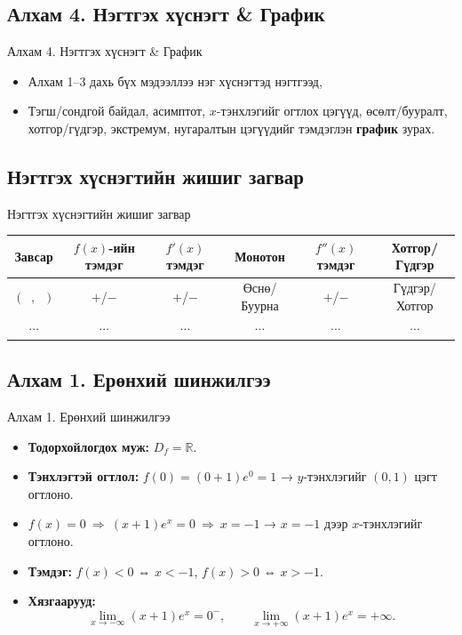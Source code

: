 \subsection*{Алхам 4. Нэгтгэх хүснэгт \& График}
\begin{frame}[allowframebreaks]{Алхам 4. Нэгтгэх хүснэгт \& График}
\begin{itemize}
  \item Алхам 1–3 дахь бүх мэдээллээ нэг хүснэгтэд нэгтгээд,
  \item Тэгш/сондгой байдал, асимптот, $x$-тэнхлэгийг огтлох цэгүүд, өсөлт/бууралт, хотгор/гүдгэр,
        экстремум, нугаралтын цэгүүдийг тэмдэглэн \textbf{график} зурах.
\end{itemize}
\end{frame}

\subsection*{Нэгтгэх хүснэгтийн жишиг загвар}
\begin{frame}[allowframebreaks]{Нэгтгэх хүснэгтийн жишиг загвар}
\begin{center}
\renewcommand{\arraystretch}{1.2}
\begin{fitbox}\begin{tabular}{|c|c|c|c|c|c|}
\hline
Завсар & $f(x)$-ийн тэмдэг & $f'(x)$ тэмдэг & Монотон & $f''(x)$ тэмдэг & Хотгор/Гүдгэр \\
\hline
$(\;\;,\;\;)$ & $+$/$-$ & $+$/$-$ & Өснө/Буурна & $+$/$-$ & Гүдгэр/Хотгор \\
\hline
$\cdots$ & $\cdots$ & $\cdots$ & $\cdots$ & $\cdots$ & $\cdots$ \\
\hline
\end{tabular}\end{fitbox}
\end{center}
\end{frame}

\subsection*{Алхам 1. Ерөнхий шинжилгээ}
\begin{frame}[allowframebreaks]{Алхам 1. Ерөнхий шинжилгээ}
\begin{itemize}
  \item \textbf{Тодорхойлогдох муж:} $D_f=\mathbb{R}$.
  \item \textbf{Тэнхлэгтэй огтлол:} $f(0)=(0+1)e^0=1$ → $y$-тэнхлэгийг $(0,1)$ цэгт огтлоно.
  \item $f(x)=0 \ \Rightarrow\ (x+1)e^x=0 \ \Rightarrow\ x=-1$ → $x=-1$ дээр $x$-тэнхлэгийг огтлоно.
  \item \textbf{Тэмдэг:} $f(x)<0$ ⇔ $x<-1$, $f(x)>0$ ⇔ $x>-1$.
  \item \textbf{Хязгаарууд:} 
  \[
  \lim_{x\to -\infty} (x+1)e^x = 0^{-}, \qquad 
  \lim_{x\to +\infty} (x+1)e^x = +\infty.
  \]
\end{itemize}
\end{frame}

